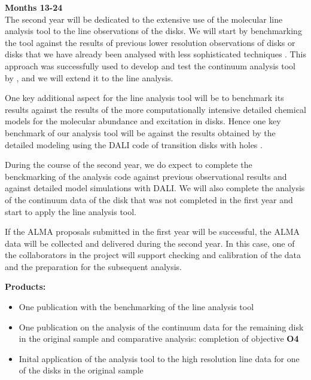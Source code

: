 \documentclass[10pt,fleqn,twoside]{article}
\begin{document}
{\Tcol\bf Months 13-24}\\
The second year will be dedicated to the extensive use of the molecular line analysis tool to
the line observations of the disks. We will start by benchmarking the tool against the results of previous lower resolution observations of disks or disks that we have already been analysed with less sophisticated techniques \citep[e.g.][]{Isella2016}. This approach was successfully used to develop and test the continuum analysis tool by \citet{2016A&A...588A..53T}, and we will extend it to the line analysis. 

One key additional aspect for the line analysis tool will be to benchmark its results against the results of the more computationally intensive detailed chemical models for the molecular abundance and excitation in disks. Hence one key benchmark of our analysis tool will be against the results obtained by the detailed modeling using the DALI code of transition disks with holes \citep{2016A&A...585A..58V}. 

During the course of the second year, we do expect to complete the benckmarking of the analysis code against previous observational results and against detailed model simulations with DALI. 
We will also complete the analysis of the continuum data of the disk that was not completed in the first year and start to apply the line analysis tool.

If the ALMA proposals submitted in the first year will be successful, the ALMA data will be collected and delivered during the second year. In this case, one of the collaborators in the project will support checking and calibration of the data and the preparation for the subsequent analysis. 

\smallskip
{\bf Products:} 
\begin{itemize}
\item One publication with the benchmarking of the line analysis tool
\item One publication on the analysis of the continuum data for the remaining disk in the original sample and comparative analysis: completion of objective {\bf O4}
\item Inital application of the analysis tool to the high resolution line data for one of the disks in the original sample
\end{itemize}
\end{document}
